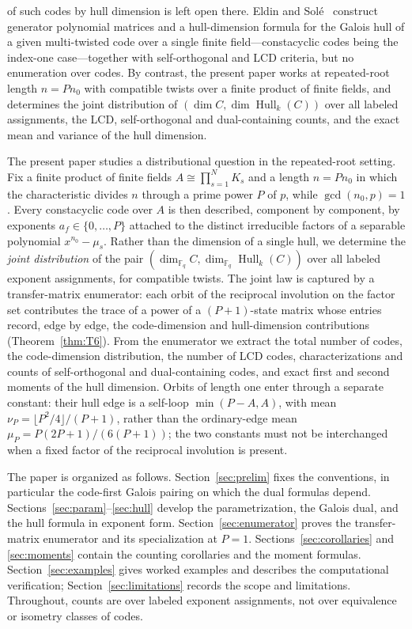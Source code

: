 \documentclass[11pt]{article}
\theoremstyle{definition}
\theoremstyle{remark}
\newcommand{\Fq}{\mathbb{F}_q}
\newcommand{\Hull}{\operatorname{Hull}}
\begin{document}
of such codes by hull dimension is left open there. Eldin and
Sol\'e~\cite{ES2026} construct generator polynomial matrices and a
hull-dimension formula for the Galois hull of a given multi-twisted
code over a single finite field---constacyclic codes being the
index-one case---together with self-orthogonal and LCD criteria, but
no enumeration over codes. By contrast, the present paper works at
repeated-root length \(n = P n_0\) with compatible twists over a
finite product of finite fields, and determines the joint distribution
of \((\dim C, \dim \Hull_k(C))\) over all labeled assignments, the
LCD, self-orthogonal and dual-containing counts, and the exact mean
and variance of the hull dimension.

The present paper studies a distributional question in the repeated-root
setting. Fix a finite product of finite fields
\(A \cong \prod_{s=1}^{N} K_s\) and a length \(n = P n_0\) in which the
characteristic divides \(n\) through a prime power \(P\) of \(p\),
while \(\gcd(n_0, p) = 1\). Every constacyclic code over \(A\) is then
described, component by component, by exponents
\(a_f \in \{0, \dots, P\}\) attached to the distinct irreducible factors
of a separable polynomial \(x^{n_0} - \mu_s\). Rather than the dimension of
a single hull, we determine the \emph{joint distribution} of the pair
\((\dim_{\Fq} C, \dim_{\Fq} \Hull_k(C))\) over all labeled exponent
assignments, for compatible twists. The joint law is captured by a
transfer-matrix enumerator: each orbit of the reciprocal involution on
the factor set contributes the trace of a power of a \((P{+}1)\)-state
matrix whose entries record, edge by edge, the code-dimension and
hull-dimension contributions (Theorem~\ref{thm:T6}). From the enumerator
we extract the total number of codes, the code-dimension distribution,
the number of LCD codes, characterizations and counts of self-orthogonal
and dual-containing codes, and exact first and second moments of the hull
dimension. Orbits of length one enter through a separate constant:
their hull edge is a self-loop \(\min(P-A, A)\), with mean
\(\nu_P = \lfloor P^2/4 \rfloor / (P+1)\), rather than the ordinary-edge
mean \(\mu_P = P(2P+1)/(6(P+1))\); the two constants must not be
interchanged when a fixed factor of the reciprocal involution is
present.

The paper is organized as follows. Section~\ref{sec:prelim} fixes the
conventions, in particular the code-first Galois pairing on which the
dual formulas depend. Sections~\ref{sec:param}--\ref{sec:hull} develop
the parametrization, the Galois dual, and the hull formula in exponent
form. Section~\ref{sec:enumerator} proves the transfer-matrix enumerator
and its specialization at \(P=1\). Sections~\ref{sec:corollaries} and
\ref{sec:moments} contain the counting corollaries and the moment
formulas. Section~\ref{sec:examples} gives worked examples and describes
the computational verification; Section~\ref{sec:limitations} records
the scope and limitations. Throughout, counts are over labeled exponent
assignments, not over equivalence or isometry classes of codes.
\end{document}
